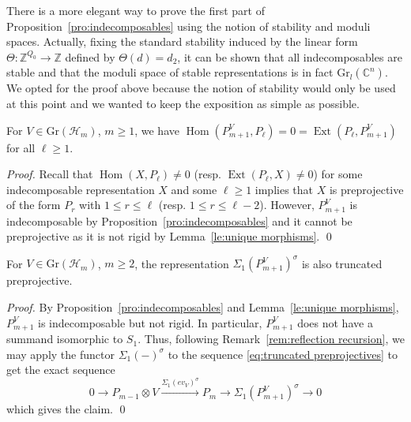 \documentclass[smallextended,envcountsect,envcountsame]{svjour3}
\numberwithin{equation}{section}
\newcommand{\CC}{\mathbb{C}}
\newcommand{\ZZ}{\mathbb{Z}}
\newcommand{\cH}{\mathcal{H}}
\newcommand{\Ext}{\operatorname{Ext}}
\newcommand{\Gr}{\mathrm{Gr}}
\newcommand{\Hom}{\operatorname{Hom}}
\begin{document}
\begin{remark}
  There is a more elegant way to prove the first part of Proposition~\ref{pro:indecomposables} using the notion of stability and moduli spaces.
  Actually, fixing the standard stability induced by the linear form $\Theta:\ZZ^{Q_0}\to\ZZ$ defined by $\Theta(d)=d_2$, it can be shown that all indecomposables are stable and that the moduli space of stable representations is in fact $\Gr_l(\CC^n)$.
  We opted for the proof above because the notion of stability would only be used at this point and we wanted to keep the exposition as simple as possible. 
\end{remark}

\begin{lemma}
  \label{le:basic homological properties}
  For $V\in\Gr(\cH_m)$, $m\ge1$, we have $\Hom(P_{m+1}^V,P_\ell)=0=\Ext(P_\ell,P_{m+1}^V)$ for all $\ell\ge1$.
\end{lemma}
\begin{proof}
  Recall that $\Hom(X,P_\ell)\ne0$ (resp. $\Ext(P_\ell,X)\ne0$) for some indecomposable representation $X$ and some $\ell\ge1$ implies that $X$ is preprojective of the form $P_r$ with $1\le r\le\ell$ (resp. $1\le r\le\ell-2$).
  However, $P_{m+1}^V$ is indecomposable by Proposition~\ref{pro:indecomposables} and it cannot be preprojective as it is not rigid by Lemma~\ref{le:unique morphisms}.
\qed\end{proof}

\begin{lemma}
  \label{le:reflected truncated preprojectives}
  For $V\in\Gr(\cH_m)$, $m\ge2$, the representation $\Sigma_1(P_{m+1}^V)^\sigma$ is also truncated preprojective.
\end{lemma}
\begin{proof}
  By Proposition~\ref{pro:indecomposables} and Lemma~\ref{le:unique morphisms}, $P_{m+1}^V$ is indecomposable but not rigid.
  In particular, $P_{m+1}^V$ does not have a summand isomorphic to $S_1$.
  Thus, following Remark~\ref{rem:reflection recursion}, we may apply the functor $\Sigma_1(-)^\sigma$ to the sequence \eqref{eq:truncated preprojectives} to get the exact sequence
  \[0\longrightarrow P_{m-1}\otimes V\xrightarrow{\Sigma_1(ev_V)^\sigma} P_m\longrightarrow \Sigma_1(P_{m+1}^V)^\sigma\longrightarrow 0\]
  which gives the claim.
\qed\end{proof}
\end{document}

